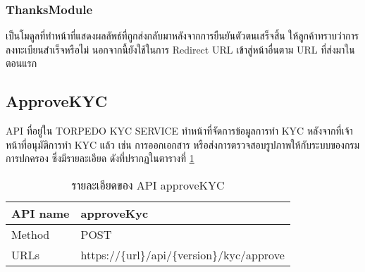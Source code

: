 	 \subsubsection{ThanksModule}
	 เป็นโมดูลที่ทำหน้าที่แสดงผลลัพธ์ที่ถูกส่งกลับมาหลังจากการยืนยันตัวตนเสร็จสิ้น ให้ลูกค้าทราบว่าการลงทะเบียนสำเร็จหรือไม่ นอกจากนี้ยังใช้ในการ Redirect URL เข้าสู่หน้าอื่นตาม URL ที่ส่งมาในตอนแรก
	 
\subsection{ApproveKYC}
	API ที่อยู่ใน TORPEDO KYC SERVICE ทำหน้าที่จัดการข้อมูลการทำ KYC หลังจากที่เจ้าหน้าที่อนุมัติการทำ KYC แล้ว เช่น การออกเอกสาร หรือส่งการตรวจสอบรูปภาพให้กับระบบของกรมการปกครอง ซึ่งมีรายละเอียด ดังที่ปรากฏในตารางที่ \ref{Table:specApproveKYC}
	\begin{table}[!htb]
		\centering
		\captionsetup{singlelinecheck = false, justification=justified}
		\caption{รายละเอียดของ API approveKYC}
		\label{Table:specApproveKYC}
		\begin{tabular}{|l|l|}
			\hline
			\rowcolor[HTML]{FFFFFF} 
			API name & approveKyc \\ \hline
			Method & POST \\ \hline
			URLs & https://\{url\}/api/\{version\}/kyc/approve \\ \hline
		\end{tabular}
	\end{table}
